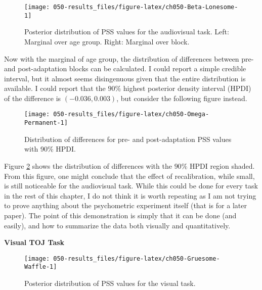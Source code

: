 \documentclass[11pt, oneside, openany]{scrbook}
\begin{document}
\begin{figure}

{\centering \texttt{[image: 050-results\_files/figure-latex/ch050-Beta-Lonesome-1]} 

}

\caption{Posterior distribution of PSS values for the audiovisual task. Left: Marginal over age group. Right: Marginal over block.}\label{fig:ch050-Beta-Lonesome}
\end{figure}

Now with the marginal of age group, the distribution of differences between pre- and post-adaptation blocks can be calculated. I could report a simple credible interval, but it almost seems disingenuous given that the entire distribution is available. I could report that the \(90\%\) highest posterior density interval (HPDI) of the difference is \((-0.036, 0.003)\), but consider the following figure instead.

\begin{figure}

{\centering \texttt{[image: 050-results\_files/figure-latex/ch050-Omega-Permanent-1]} 

}

\caption{Distribution of differences for pre- and post-adaptation PSS values with 90\% HPDI.}\label{fig:ch050-Omega-Permanent}
\end{figure}

Figure \ref{fig:ch050-Omega-Permanent} shows the distribution of differences with the \(90\%\) HPDI region shaded. From this figure, one might conclude that the effect of recalibration, while small, is still noticeable for the audiovisual task. While this could be done for every task in the rest of this chapter, I do not think it is worth repeating as I am not trying to prove anything about the psychometric experiment itself (that is for a later paper). The point of this demonstration is simply that it can be done (and easily), and how to summarize the data both visually and quantitatively.

\textbf{Visual TOJ Task}

\begin{figure}

{\centering \texttt{[image: 050-results\_files/figure-latex/ch050-Gruesome-Waffle-1]} 

}

\caption{Posterior distribution of PSS values for the visual task.}\label{fig:ch050-Gruesome-Waffle}
\end{figure}
\end{document}
